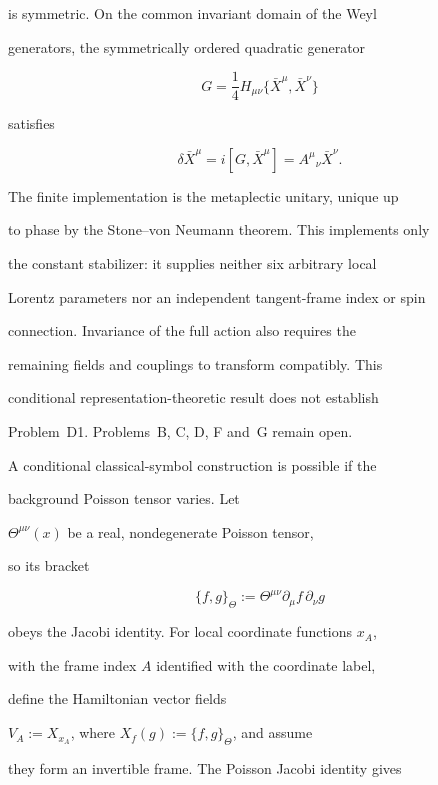 is symmetric. On the common invariant domain of the Weyl

generators, the symmetrically ordered quadratic generator

\[

  G=\frac14 H_{\mu\nu}

    \{\bar X^\mu,\bar X^\nu\}

\]

satisfies

\[

  \delta\bar X^\mu=i[G,\bar X^\mu]

  =A^\mu{}_\nu\bar X^\nu.

\]

The finite implementation is the metaplectic unitary, unique up

to phase by the Stone--von Neumann theorem. This implements only

the constant stabilizer: it supplies neither six arbitrary local

Lorentz parameters nor an independent tangent-frame index or spin

connection. Invariance of the full action also requires the

remaining fields and couplings to transform compatibly. This

conditional representation-theoretic result does not establish

Problem~D1. Problems~B, C, D, F and~G remain open.



A conditional classical-symbol construction is possible if the

background Poisson tensor varies. Let

\(\Theta^{\mu\nu}(x)\) be a real, nondegenerate Poisson tensor,

so its bracket

\[

  \{f,g\}_\Theta

  :=\Theta^{\mu\nu}\partial_\mu f\,\partial_\nu g

\]

obeys the Jacobi identity. For local coordinate functions \(x_A\),

with the frame index \(A\) identified with the coordinate label,

define the Hamiltonian vector fields

\(V_A:=X_{x_A}\), where \(X_f(g):=\{f,g\}_\Theta\), and assume

they form an invertible frame. The Poisson Jacobi identity gives

